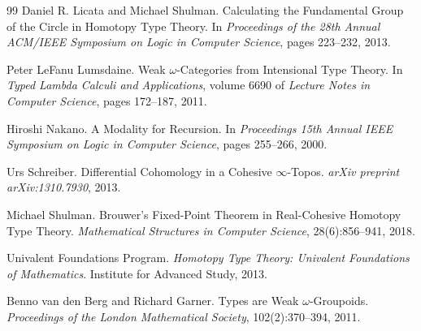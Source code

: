 \documentclass[11pt]{article}
\theoremstyle{plain}
\theoremstyle{definition}
\theoremstyle{remark}
\begin{document}
\begin{thebibliography}{99}
Daniel R. Licata and Michael Shulman.
\newblock Calculating the Fundamental Group of the Circle in Homotopy Type Theory.
\newblock In \emph{Proceedings of the 28th Annual ACM/IEEE Symposium on Logic in Computer Science}, pages 223--232, 2013.

Peter LeFanu Lumsdaine.
\newblock Weak {$\omega$}-Categories from Intensional Type Theory.
\newblock In \emph{Typed Lambda Calculi and Applications}, volume 6690 of \emph{Lecture Notes in Computer Science}, pages 172--187, 2011.

Hiroshi Nakano.
\newblock A Modality for Recursion.
\newblock In \emph{Proceedings 15th Annual IEEE Symposium on Logic in Computer Science}, pages 255--266, 2000.

Urs Schreiber.
\newblock Differential Cohomology in a Cohesive {$\infty$}-Topos.
\newblock \emph{arXiv preprint arXiv:1310.7930}, 2013.

Michael Shulman.
\newblock Brouwer's Fixed-Point Theorem in Real-Cohesive Homotopy Type Theory.
\newblock \emph{Mathematical Structures in Computer Science}, 28(6):856--941, 2018.

Univalent Foundations Program.
\newblock \emph{Homotopy Type Theory: Univalent Foundations of Mathematics}.
\newblock Institute for Advanced Study, 2013.

Benno van den Berg and Richard Garner.
\newblock Types are Weak {$\omega$}-Groupoids.
\newblock \emph{Proceedings of the London Mathematical Society}, 102(2):370--394, 2011.

\end{thebibliography}
\end{document}
